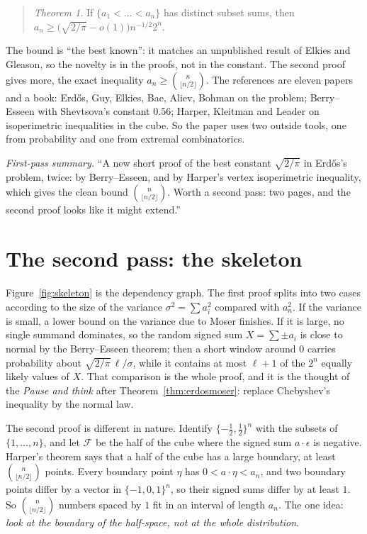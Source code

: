 \begin{quote}
\emph{Theorem 1.} If $\{a_1<\dots<a_n\}$ has distinct subset sums, then $a_n\ge\bigl(\sqrt{2/\pi}-o(1)\bigr)n^{-1/2}2^n$.
\end{quote}

The bound is ``the best known'': it matches an unpublished result of Elkies and Gleason, so the novelty is in the proofs, not in the
constant. The second proof gives more, the exact inequality $a_n\ge\binom n{\lfloor n/2\rfloor}$. The references are eleven papers and a book: Erd\H os, Guy,
Elkies, Bae, Aliev, Bohman on the problem; Berry--Esseen with Shevtsova's constant $0.56$; Harper, Kleitman and Leader on isoperimetric inequalities in
the cube. So the paper uses two outside tools, one from probability and one from extremal combinatorics.

\emph{First-pass summary.} ``A new short proof of the best constant $\sqrt{2/\pi}$ in Erd\H os's problem, twice: by Berry--Esseen, and by Harper's vertex
isoperimetric inequality, which gives the clean bound $\binom n{\lfloor n/2\rfloor}$. Worth a second pass: two pages, and the second proof looks like it might extend.''

\section{The second pass: the skeleton}

Figure~\ref{fig:skeleton} is the dependency graph. The first proof splits into two cases according to the size of the variance
$\sigma^2=\sum a_i^2$ compared with $a_n^2$. If the variance is small, a lower bound on the variance due to Moser finishes. If it is large, no
single summand dominates, so the random signed sum $X=\sum\pm a_i$ is close to normal by the Berry--Esseen theorem; then a short window around
$0$ carries probability about $\sqrt{2/\pi}\,\ell/\sigma$, while it contains at most $\ell+1$ of the $2^n$ equally likely values of $X$. That comparison is the
whole proof, and it is the thought of the \emph{Pause and think} after Theorem~\ref{thm:erdosmoser}: replace Chebyshev's inequality by the normal law.

The second proof is different in nature. Identify $\{-\frac12,\frac12\}^n$ with the subsets of $\{1,\dots,n\}$, and let $\mathcal F$ be the half of the cube where the
signed sum $a\cdot\epsilon$ is negative. Harper's theorem says that a half of the cube has a large boundary, at least $\binom n{\lfloor n/2\rfloor}$ points.
Every boundary point $\eta$ has $0<a\cdot\eta<a_n$, and two boundary points differ by a vector in $\{-1,0,1\}^n$, so their signed sums differ by at least $1$.
So $\binom n{\lfloor n/2\rfloor}$ numbers spaced by $1$ fit in an interval of length $a_n$. The one idea: \emph{look at the boundary of the half-space, not at the whole
distribution}.

